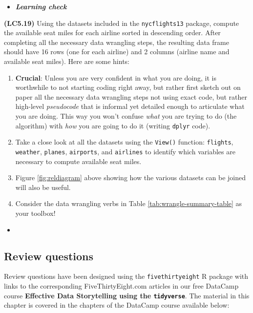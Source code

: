 \documentclass[12pt,]{krantz}
\providecommand{\tightlist}{%
  \setlength{\itemsep}{0pt}\setlength{\parskip}{0pt}}
\newenvironment{rmdblock}[1]
  {\begin{shaded*}
  \begin{itemize}
  \renewcommand{\labelitemi}{
    \raisebox{-.7\height}[0pt][0pt]{
    }
  }
  \item
  }
  {
  \end{itemize}
  \end{shaded*}
  }
\newenvironment{learncheck}
  {\begin{rmdblock}{warning}}
  {\end{rmdblock}}
\begin{document}
\begin{learncheck}
\textbf{\emph{Learning check}}
\end{learncheck}

\textbf{(LC5.19)} Using the datasets included in the
\texttt{nycflights13} package, compute the available seat miles for each
airline sorted in descending order. After completing all the necessary
data wrangling steps, the resulting data frame should have 16 rows (one
for each airline) and 2 columns (airline name and available seat miles).
Here are some hints:

\begin{enumerate}
\def\labelenumi{\arabic{enumi}.}
\tightlist
\item
  \textbf{Crucial}: Unless you are very confident in what you are doing,
  it is worthwhile to not starting coding right away, but rather first
  sketch out on paper all the necessary data wrangling steps not using
  exact code, but rather high-level \emph{pseudocode} that is informal
  yet detailed enough to articulate what you are doing. This way you
  won't confuse \emph{what} you are trying to do (the algorithm) with
  \emph{how} you are going to do it (writing \texttt{dplyr} code).
\item
  Take a close look at all the datasets using the \texttt{View()}
  function: \texttt{flights}, \texttt{weather}, \texttt{planes},
  \texttt{airports}, and \texttt{airlines} to identify which variables
  are necessary to compute available seat miles.
\item
  Figure \ref{fig:reldiagram} above showing how the various datasets can
  be joined will also be useful.
\item
  Consider the data wrangling verbs in Table
  \ref{tab:wrangle-summary-table} as your toolbox!
\end{enumerate}

\begin{learncheck}

\end{learncheck}

\subsection{Review questions}\label{review-questions-2}

Review questions have been designed using the \texttt{fivethirtyeight} R
package \citep{R-fivethirtyeight} with links to the corresponding
FiveThirtyEight.com articles in our free DataCamp course
\textbf{Effective Data Storytelling using the \texttt{tidyverse}}. The
material in this chapter is covered in the chapters of the DataCamp
course available below:
\end{document}
